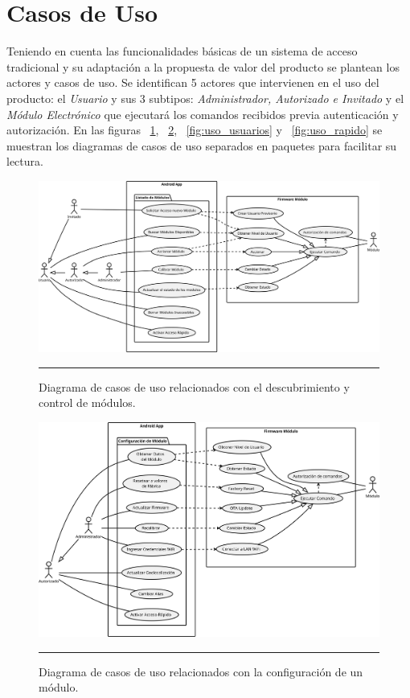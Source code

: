 \section{Casos de Uso}
Teniendo en cuenta las funcionalidades básicas de un sistema de acceso tradicional y su adaptación a la propuesta de valor del producto se plantean los actores y casos de uso. %
Se identifican 5 actores que intervienen en el uso del producto: el \emph{Usuario} y sus 3 subtipos: \emph{Administrador, Autorizado e Invitado} y el \emph{Módulo Electrónico} que ejecutará los comandos recibidos previa autenticación y autorización.
En las figuras ~\ref{fig:uso_listado}, ~\ref{fig:uso_config}, ~\ref{fig:uso_usuarios} y ~\ref{fig:uso_rapido} se muestran los diagramas de casos de uso separados en paquetes para facilitar su lectura.
\begin{figure}[htbp]
	\centering
	\includegraphics[width=\textwidth]{Figures/reque/USE_listado.png}
	\rule{35em}{1pt}
	\caption[Diagrama de Casos de Uso]{Diagrama de casos de uso relacionados con el descubrimiento y control de módulos.}
	\label{fig:uso_listado}
\end{figure}

\begin{figure}[htbp]
	\centering
	\includegraphics[width=\textwidth]{Figures/reque/USE_config.png}
	\rule{35em}{1pt}
	\caption[Diagrama de Casos de Uso]{Diagrama de casos de uso relacionados con la configuración de un módulo.}
	\label{fig:uso_config}
\end{figure}

